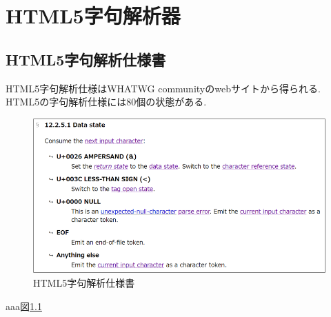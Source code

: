 \documentclass[uplatex,a4j]{jsreport}
\begin{document}
\chapter{HTML5字句解析器}
\section{HTML5字句解析仕様書}
HTML5字句解析仕様はWHATWG communityのwebサイトから得られる.~\cite{html5specification}
HTML5の字句解析仕様には80個の状態がある.
\begin{figure}[h]
    \centering
    \includegraphics[keepaspectratio, scale=1.0]
         {figure/html5.png}
    \caption{HTML5字句解析仕様書}
    \label{html5}
\end{figure}
   aaa図\ref{html5}

\end{document}
